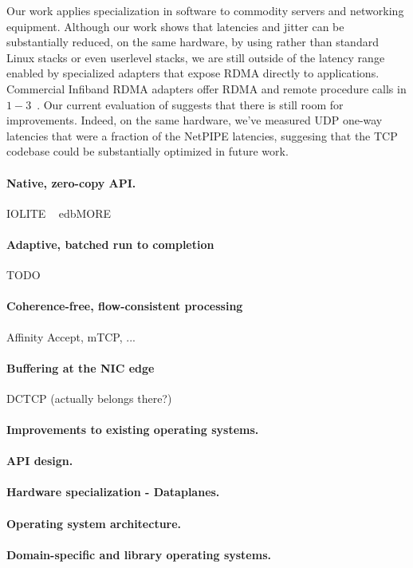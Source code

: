  Our work applies
specialization in software to commodity servers and networking
equipment.  Although our work shows that latencies and jitter can be
substantially reduced, on the same hardware, by using \ix rather than
standard Linux stacks or even userlevel stacks, we are still outside
of the latency range enabled by specialized adapters that expose RDMA
directly to applications.  Commercial Infiband RDMA adapters offer
RDMA and remote procedure calls in
$1-3$\microsecond~\cite{DBLP:conf/sosp/OngaroRSOR11,Jose:2011:MDH,mitchell:rdma,dragojevic14farm}.
Our current evaluation of \ix suggests that there is still room for
improvements.  Indeed, on the same hardware, we've measured UDP
one-way latencies that were a fraction of the NetPIPE latencies,
suggesing that the TCP codebase could be substantially optimized in
future work.

\paragraph{Native, zero-copy API.}

\todo IOLITE ~\cite{DBLP:journals/tocs/PaiDZ00}
\todo edb{MORE}

\paragraph{Adaptive, batched run to completion}

\todo TODO

\paragraph{Coherence-free, flow-consistent processing}

\todo Affinity Accept, mTCP, ...

\paragraph{Buffering at the NIC edge}

\todo DCTCP (actually belongs there?)


\paragraph{Improvements to existing operating systems.}

\paragraph{API design.}


\paragraph{Hardware specialization - Dataplanes.}

\paragraph{Operating system architecture.}

\paragraph{Domain-specific and library operating systems.}
